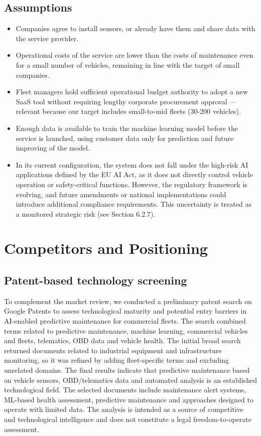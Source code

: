 \documentclass[11pt,a4paper]{article}
\begin{document}
\subsection{Assumptions}
\begin{itemize} 
    \item Companies agree to install sensors, or already have them and share data with the service provider.
    \item Operational costs of the service are lower than the costs of maintenance even for a small number of vehicles, remaining in line with the target of small companies.
    \item Fleet managers hold sufficient operational budget authority to adopt a new SaaS tool without requiring lengthy corporate procurement approval — relevant because our target includes small-to-mid fleets (30-200 vehicles).
    \item Enough data is available to train the machine learning model before the service is launched, using customer data only for prediction and future improving of the model. 
    \item In its current configuration, the system does not fall under the high-risk AI applications defined by the EU AI Act, as it does not directly control vehicle operation or safety-critical functions. However, the regulatory framework is evolving, and future amendments or national implementations could introduce additional compliance requirements. This uncertainty is treated as a monitored strategic risk (see Section 6.2.7).
\end{itemize} 

\section{Competitors and Positioning}
\subsection{Patent-based technology screening}

To complement the market review, we conducted a preliminary patent search on Google Patents to assess technological maturity and potential entry barriers in AI-enabled predictive maintenance for commercial fleets. The search combined terms related to predictive maintenance, machine learning, commercial vehicles and fleets, telematics, OBD data and vehicle health. The initial broad search returned documents related to industrial equipment and infrastructure monitoring, so it was refined by adding fleet-specific terms and excluding unrelated domains.
The final results indicate that predictive maintenance based on vehicle sensors, OBD/telematics data and automated analysis is an established technological field. The selected documents include maintenance alert systems, ML-based health assessment, predictive maintenance and approaches designed to operate with limited data. The analysis is intended as a source of competitive and technological intelligence and does not constitute a legal freedom-to-operate assessment.
\end{document}
